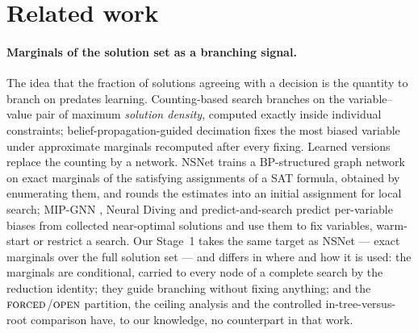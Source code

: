 \documentclass[final,5p,times,twocolumn]{elsarticle}
\newcommand{\FORCED}{\textsc{forced}}
\newcommand{\FREE}{\textsc{open}}
\begin{document}
\section{Related work}
\label{sec:related}

\paragraph{Marginals of the solution set as a branching signal.} The idea that the fraction of solutions agreeing with a decision is the quantity to branch on predates learning. Counting-based search \citep{pesant2012counting} branches on the variable--value pair of maximum \emph{solution density}, computed exactly inside individual constraints; belief-propagation-guided decimation \citep{montanari2007solving} fixes the most biased variable under approximate marginals recomputed after every fixing. Learned versions replace the counting by a network. NSNet \citep{li2022nsnet} trains a BP-structured graph network on exact marginals of the satisfying assignments of a SAT formula, obtained by enumerating them, and rounds the estimates into an initial assignment for local search; MIP-GNN \citep{khalil2022mipgnn}, Neural Diving \citep{nair2020solving} and predict-and-search \citep{han2023gnn} predict per-variable biases from collected near-optimal solutions and use them to fix variables, warm-start or restrict a search. Our Stage~1 takes the same target as NSNet --- exact marginals over the full solution set --- and differs in where and how it is used: the marginals are conditional, carried to every node of a complete search by the reduction identity; they guide branching without fixing anything; and the $\FORCED$/$\FREE$ partition, the ceiling analysis and the controlled in-tree-versus-root comparison have, to our knowledge, no counterpart in that work.
\end{document}
